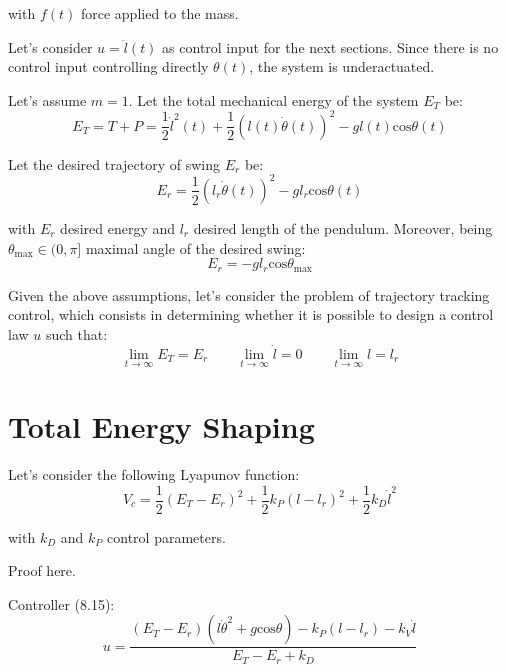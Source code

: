 \documentclass[a4paper]{article}
\begin{document}
\noindent with $f(t)$ force applied to the mass.

Let's consider $u = \ddot{l}(t)$ as control input for the next sections. Since 
there is no control input controlling directly $\theta(t)$, the system is
underactuated.

Let's assume $m=1$. Let the total mechanical energy of the system $E_T$ be:
\begin{equation}
  E_T = T + P
      = \frac{1}{2}\dot{l}^2(t) + \frac{1}{2}(l(t)\dot{\theta}(t))^2
        - g l(t) \text{cos}\theta(t)
\end{equation}

Let the desired trajectory of swing $E_r$ be:
\begin{equation}
  E_r = \frac{1}{2}(l_r \dot{\theta}(t))^2 - g l_r \text{cos} \theta(t)
\end{equation}

\noindent with $E_r$ desired energy and $l_r$ desired length of the pendulum.
Moreover, being $\theta_{\text{max}} \in (0, \pi]$ maximal angle of the desired swing:
\begin{equation}
  E_r = -g l_r \text{cos}\theta_{\text{max}}
\end{equation}

Given the above assumptions, let's consider the problem of trajectory tracking
control, which consists in determining whether it is possible to design a
control law $u$ such that:
\begin{equation}
  \lim_{t\to\infty} E_T = E_r \qquad
  \lim_{t\to\infty} \dot{l} = 0 \qquad
  \lim_{t\to\infty} l = l_r 
\end{equation}

\section{Total Energy Shaping}
Let's consider the following Lyapunov function:
\begin{equation}
  V_c = \frac{1}{2} (E_T - E_r)^2 +
        \frac{1}{2} k_P (l - l_r)^2 +
        \frac{1}{2} k_D \dot{l}^2
\end{equation}

\noindent with $k_D$ and $k_P$ control parameters.

Proof here.

Controller (8.15):
\begin{equation}
  u = \frac{(E_T - E_r)(l\dot{\theta}^2 + g\text{cos}\theta) - k_P(l-l_r)
    - k_V \dot{l}}{E_T - E_r + k_D}
\end{equation}
\end{document}
